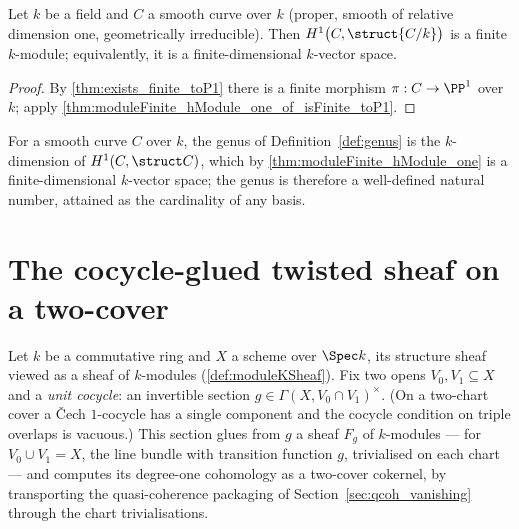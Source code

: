 \begin{theorem}
  \label{thm:moduleFinite_hModule_one}
  \leanok
  Let \(k\) be a field and \(C\) a smooth curve over \(k\) (proper, smooth of relative
  dimension one, geometrically irreducible). Then
  \(H^1\bigl(C, \struct{C/k}\bigr)\) is a finite \(k\)-module; equivalently, it is a
  finite-dimensional \(k\)-vector space.
\end{theorem}
\begin{proof}
  \leanok
  By \ref{thm:exists_finite_toP1} there is a finite morphism \(\pi : C \to \PP^1\) over
  \(k\); apply \ref{thm:moduleFinite_hModule_one_of_isFinite_toP1}.
\end{proof}

\begin{remark}
  \label{rem:genus_finite}
  \leanok
  For a smooth curve \(C\) over \(k\), the genus of Definition~\ref{def:genus} is the
  \(k\)-dimension of \(H^1(C, \struct C)\), which by
  \ref{thm:moduleFinite_hModule_one} is a finite-dimensional \(k\)-vector space; the
  genus is therefore a well-defined natural number, attained as the cardinality of any
  basis.
\end{remark}

\section{The cocycle-glued twisted sheaf on a two-cover}
\label{sec:twisted_sheaf}

Let \(k\) be a commutative ring and \(X\) a scheme over \(\Spec k\), its structure sheaf
viewed as a sheaf of \(k\)-modules (\ref{def:moduleKSheaf}). Fix two opens
\(V_0, V_1 \subseteq X\) and a \emph{unit cocycle}: an invertible section
\(g \in \Gamma(X, V_0 \cap V_1)^{\times}\). (On a two-chart cover a \v{C}ech
\(1\)-cocycle has a single component and the cocycle condition on triple overlaps is
vacuous.) This section glues from \(g\) a sheaf \(F_g\) of \(k\)-modules --- for
\(V_0 \cup V_1 = X\), the line bundle with transition function \(g\), trivialised on each
chart --- and computes its degree-one cohomology as a two-cover cokernel, by transporting
the quasi-coherence packaging of Section~\ref{sec:qcoh_vanishing} through the chart
trivialisations.

